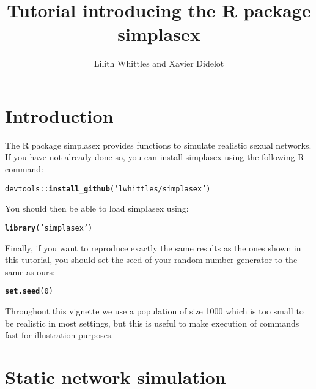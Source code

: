 \documentclass[a4paper]{article}\usepackage[]{graphicx}\usepackage[]{color}
\title{Tutorial introducing the R package simplasex}
\author{Lilith Whittles and Xavier Didelot}
\makeatletter
\newcommand{\hlnum}[1]{\textcolor[rgb]{0.686,0.059,0.569}{#1}}%
\newcommand{\hlstr}[1]{\textcolor[rgb]{0.192,0.494,0.8}{#1}}%
\newcommand{\hlopt}[1]{\textcolor[rgb]{0,0,0}{#1}}%
\newcommand{\hlstd}[1]{\textcolor[rgb]{0.345,0.345,0.345}{#1}}%
\newcommand{\hlkwd}[1]{\textcolor[rgb]{0.737,0.353,0.396}{\textbf{#1}}}%
\newenvironment{kframe}{%
 \def\at@end@of@kframe{}%
 \ifinner\ifhmode%
  \def\at@end@of@kframe{\end{minipage}}%
  \begin{minipage}{\columnwidth}%
 \fi\fi%
 \def\FrameCommand##1{\hskip\@totalleftmargin \hskip-\fboxsep
 \colorbox{shadecolor}{##1}\hskip-\fboxsep
     \hskip-\linewidth \hskip-\@totalleftmargin \hskip\columnwidth}%
 \MakeFramed {\advance\hsize-\width
   \@totalleftmargin\z@ \linewidth\hsize
   \@setminipage}}%
 {\par\unskip\endMakeFramed%
 \at@end@of@kframe}
\newenvironment{knitrout}{}{} %
\makeatother
\begin{document}
\maketitle

\section{Introduction}

The R package simplasex provides functions to simulate realistic sexual networks.
If you have not already done so, you can install simplasex using the following R command:

\begin{knitrout}
\color{fgcolor}\begin{kframe}
\begin{alltt}
\hlstd{devtools}\hlopt{::}\hlkwd{install_github}\hlstd{(}\hlstr{'lwhittles/simplasex'}\hlstd{)}
\end{alltt}
\end{kframe}
\end{knitrout}

You should then be able to load simplasex using:
\begin{knitrout}
\color{fgcolor}\begin{kframe}
\begin{alltt}
\hlkwd{library}\hlstd{(}\hlstr{'simplasex'}\hlstd{)}
\end{alltt}
\end{kframe}
\end{knitrout}

Finally, if you want to reproduce exactly the same results as the ones shown in this tutorial, you should set the seed of your random number generator to the same as ours:
\begin{knitrout}
\color{fgcolor}\begin{kframe}
\begin{alltt}
\hlkwd{set.seed}\hlstd{(}\hlnum{0}\hlstd{)}
\end{alltt}
\end{kframe}
\end{knitrout}

Throughout this vignette we use a population of size 1000 which is too small to be realistic in most settings, but this is useful to make execution of commands fast for illustration purposes.

\section{Static network simulation}
\end{document}
